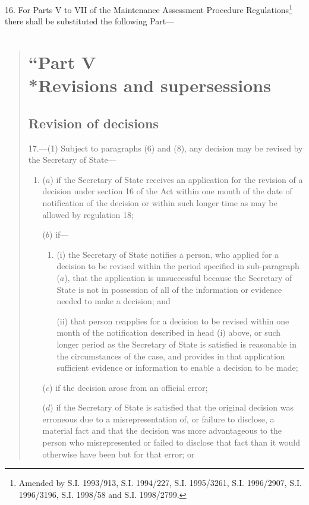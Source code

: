 \documentclass[12pt,a4paper]{article}
\begin{document}
16.  For Parts V to VII of the Maintenance Assessment Procedure Regulations\footnote{\frenchspacing Amended by S.I. 1993/913, S.I. 1994/227, S.I. 1995/3261, S.I. 1996/2907, S.I. 1996/3196, S.I. 1998/58 and S.I. 1998/2799.} there shall be substituted the following Part---
\begin{quotation}
\section*{“Part V\\*Revisions and supersessions}

\subsection*{Revision of decisions}

17.—(1) Subject to paragraphs (6) and (8), any decision may be revised by the Secretary of State---
\begin{enumerate}\item[]
($a$) if the Secretary of State receives an application for the revision of a decision under section 16 of the Act within one month of the date of notification of the decision or within such longer time as may be allowed by regulation 18;

($b$) if---
\begin{enumerate}\item[]
(i) the Secretary of State notifies a person, who applied for a decision to be revised within the period specified in sub-paragraph ($a$), that the application is unsuccessful because the Secretary of State is not in possession of all of the information or evidence needed to make a decision; and

(ii) that person reapplies for a decision to be revised within one month of the notification described in head (i) above, or such longer period as the Secretary of State is satisfied is reasonable in the circumstances of the case, and provides in that application sufficient evidence or information to enable a decision to be made;
\end{enumerate}

($c$) if the decision arose from an official error;

($d$) if the Secretary of State is satisfied that the original decision was erroneous due to a misrepresentation of, or failure to disclose, a material fact and that the decision was more advantageous to the person who misrepresented or failed to disclose that fact than it would otherwise have been but for that error; or


\end{enumerate}
\end{quotation}
\end{document}

